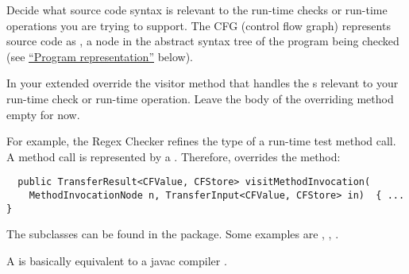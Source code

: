 
Decide what source code syntax is relevant to the run-time checks or
run-time operations you are trying to support.  The CFG (control flow
graph) represents source code as , a
node in the abstract syntax tree of the program being checked (see
\href{#creating-dataflow-representation}{``Program representation''} below).

In your extended 
override the visitor method that handles the s
relevant to your run-time check or run-time operation.
Leave the body of the overriding method empty for now.

For example, the Regex Checker refines the type of a run-time test method
call.  A method call is represented by a
.  Therefore,
 overrides the
 method:

\begin{smaller}
\begin{Verbatim}
  public TransferResult<CFValue, CFStore> visitMethodInvocation(
    MethodInvocationNode n, TransferInput<CFValue, CFStore> in)  { ... }
\end{Verbatim}
\end{smaller}




The  subclasses can be found in the
 package.  Some examples are
,
,
.

A 
is basically equivalent to a javac compiler .

